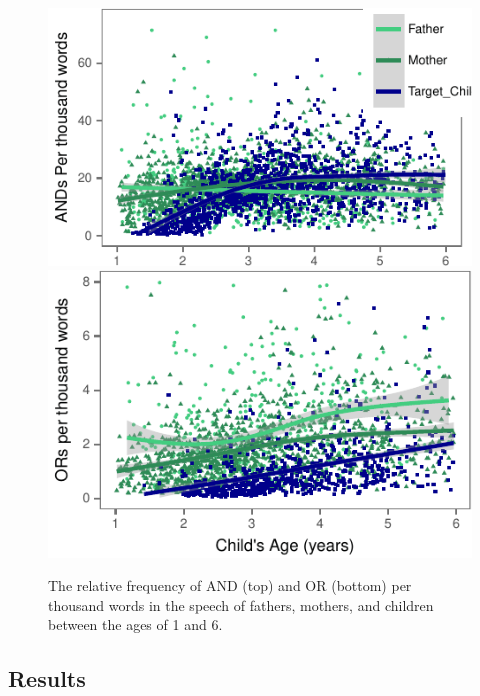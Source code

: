 \documentclass[10pt, letterpaper]{article}
\newenvironment{CodeChunk}{}{}
\begin{document}
\begin{CodeChunk}
\begin{figure}[t]
\includegraphics{figs/OverallConnectivePlots-1} \includegraphics{figs/OverallConnectivePlots-2} \caption[The relative frequency of AND (top) and OR (bottom) per thousand words in the speech of fathers, mothers, and children between the ages of 1 and 6]{The relative frequency of AND (top) and OR (bottom) per thousand words in the speech of fathers, mothers, and children between the ages of 1 and 6.}\label{fig:OverallConnectivePlots}
\end{figure}
\end{CodeChunk}

\subsection{Results}\label{results}
\end{document}
